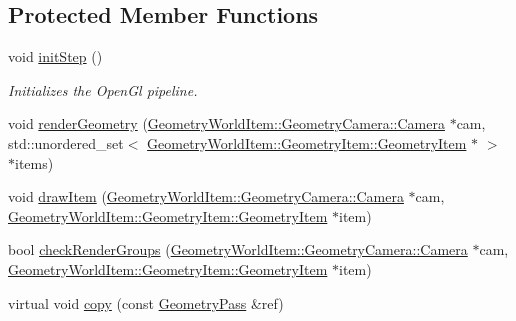 \subsection*{Protected Member Functions}
\begin{DoxyCompactItemize}
\item 
\mbox{\label{class_geometry_engine_1_1_geometry_render_step_1_1_geometry_pass_a23575018d6032000ac8f2751efcc2240}} 
void \mbox{\hyperlink{class_geometry_engine_1_1_geometry_render_step_1_1_geometry_pass_a23575018d6032000ac8f2751efcc2240}{init\+Step}} ()
\begin{DoxyCompactList}\small\item\em Initializes the Open\+Gl pipeline. \end{DoxyCompactList}\item 
void \mbox{\hyperlink{class_geometry_engine_1_1_geometry_render_step_1_1_geometry_pass_a2929c4675eb93efd992739baac565425}{render\+Geometry}} (\mbox{\hyperlink{class_geometry_engine_1_1_geometry_world_item_1_1_geometry_camera_1_1_camera}{Geometry\+World\+Item\+::\+Geometry\+Camera\+::\+Camera}} $\ast$cam, std\+::unordered\+\_\+set$<$ \mbox{\hyperlink{class_geometry_engine_1_1_geometry_world_item_1_1_geometry_item_1_1_geometry_item}{Geometry\+World\+Item\+::\+Geometry\+Item\+::\+Geometry\+Item}} $\ast$ $>$ $\ast$items)
\item 
void \mbox{\hyperlink{class_geometry_engine_1_1_geometry_render_step_1_1_geometry_pass_a0e3189d5f441ada51ef31e09f100e270}{draw\+Item}} (\mbox{\hyperlink{class_geometry_engine_1_1_geometry_world_item_1_1_geometry_camera_1_1_camera}{Geometry\+World\+Item\+::\+Geometry\+Camera\+::\+Camera}} $\ast$cam, \mbox{\hyperlink{class_geometry_engine_1_1_geometry_world_item_1_1_geometry_item_1_1_geometry_item}{Geometry\+World\+Item\+::\+Geometry\+Item\+::\+Geometry\+Item}} $\ast$item)
\item 
bool \mbox{\hyperlink{class_geometry_engine_1_1_geometry_render_step_1_1_geometry_pass_af37e4ae472e97482eed93fc443438b2e}{check\+Render\+Groups}} (\mbox{\hyperlink{class_geometry_engine_1_1_geometry_world_item_1_1_geometry_camera_1_1_camera}{Geometry\+World\+Item\+::\+Geometry\+Camera\+::\+Camera}} $\ast$cam, \mbox{\hyperlink{class_geometry_engine_1_1_geometry_world_item_1_1_geometry_item_1_1_geometry_item}{Geometry\+World\+Item\+::\+Geometry\+Item\+::\+Geometry\+Item}} $\ast$item)
\item 
virtual void \mbox{\hyperlink{class_geometry_engine_1_1_geometry_render_step_1_1_geometry_pass_ae69b08dfd47ccfcc3888ca53511b660d}{copy}} (const \mbox{\hyperlink{class_geometry_engine_1_1_geometry_render_step_1_1_geometry_pass}{Geometry\+Pass}} \&ref)
\end{DoxyCompactItemize}


